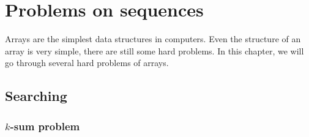 \chapter{Problems on sequences}
Arrays are the simplest data structures in computers. Even the structure of an array is very simple, there are still some hard problems. In this chapter, we will go through several hard problems of arrays.

\section{Searching}


\subsection{$k$-sum problem}


